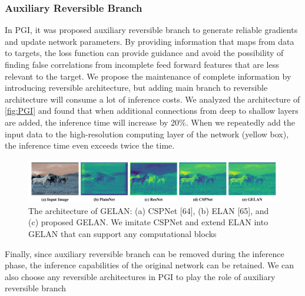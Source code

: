         \subsubsection{Auxiliary Reversible Branch}
            In PGI, it was proposed auxiliary reversible branch to generate 
            reliable gradients and update network parameters. By
            providing information that maps from data to targets, the
            loss function can provide guidance and avoid the possibility 
            of finding false correlations from incomplete feed forward 
            features that are less relevant to the target. We propose
             the maintenance of complete information by introducing
             reversible architecture, but adding main branch to reversible
             architecture will consume a lot of inference costs.
            We analyzed the architecture of \ref{fig:PGI} and found that
            when additional connections from deep to shallow layers
            are added, the inference time will increase by 20\%. When
            we repeatedly add the input data to the high-resolution computing
            layer of the network (yellow box), the inference time
            even exceeds twice the time.
            \begin{figure}[H]
                \centering
                \includegraphics[width=0.8\linewidth]{img/GELAN.png}
                \caption{The architecture of GELAN: (a) CSPNet [64], (b) ELAN [65], and (c) proposed GELAN. We imitate CSPNet and extend ELAN into GELAN that can support any computational blocks}
                \label{fig:GELAN}
            \end{figure}
            Finally, since auxiliary reversible branch can be removed
            during the inference phase, the inference capabilities of the
            original network can be retained. We can also choose any
            reversible architectures in PGI to play the role of auxiliary
            reversible branch
